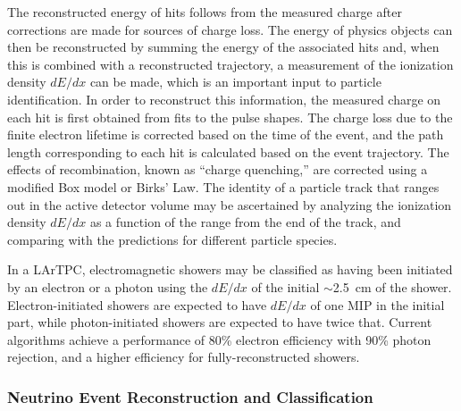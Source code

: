 The reconstructed energy of hits follows from the measured charge
after corrections are made for sources of charge loss.  The energy of
physics objects can then be reconstructed by summing the energy of the
associated hits and, when this is combined with a reconstructed
trajectory, a measurement of the ionization density $dE/dx$ can be
made, which is an important input to particle identification.  In
order to reconstruct this information, the measured charge on each hit
is first obtained from fits to the pulse shapes.  The charge loss due
to the finite electron lifetime is corrected based on the time of the
event, and the path length corresponding to each hit is calculated
based on the event trajectory.  The effects of recombination, known as
``charge quenching,'' are corrected using a modified Box
model\cite{Thomas:1987zz} or Birks' Law\cite{Birks:1964zz}.  The
identity of a particle track that ranges out in the active detector
volume may be ascertained by analyzing the ionization density $dE/dx$
as a function of the range from the end of the track, and comparing
with the predictions for different particle species.

In a LArTPC, electromagnetic showers may be classified as
having been initiated by an electron or a photon using the $dE/dx$ of
the initial $\sim$2.5~cm of the shower.  Electron-initiated showers
are expected to have $dE/dx$ of one MIP in the initial part, while
photon-initiated showers are expected to have twice that.  Current
algorithms achieve a performance of 80\% electron efficiency with 90\%
photon rejection, and %
a higher efficiency for fully-reconstructed
showers.



\subsubsection{Neutrino Event Reconstruction and Classification}

